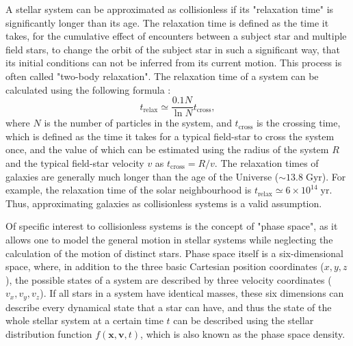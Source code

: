\documentclass[english, twoside]{HYgradu}
\begin{document}
A stellar system can be approximated as collisionless if its "relaxation time" is significantly longer than its age. The relaxation time is defined as the time it takes, for the cumulative effect of encounters between a subject star and multiple field stars, to change the orbit of the subject star in such a significant way, that its initial conditions can not be inferred from its current motion. This process is often called "two-body relaxation". The relaxation time of a system can be calculated using the following formula \citep{BinneyTremaine}:
\begin{equation}
t_\mathrm{relax} \simeq \frac{0.1N}{\ln N} t_\mathrm{cross},
\end{equation}
where $N$ is the number of particles in the system, and $t_\mathrm{cross}$ is the crossing time, which is defined as the time it takes for a typical field-star to cross the system once, and the value of which can be estimated using the radius of the system $R$ and the typical field-star velocity $v$ as $t_\mathrm{cross} = R/v$. The relaxation times of galaxies are generally much longer than the age of the Universe ($\sim 13.8 \; \mathrm{Gyr}$). For example, the relaxation time of the solar neighbourhood is $t_\mathrm{relax} \simeq 6 \times 10^{14} \; \mathrm{yr}$. Thus, approximating galaxies as collisionless systems is a valid assumption.

Of specific interest to collisionless systems is the concept of "phase space", as it allows one to model the general motion in stellar systems while neglecting the calculation of the motion of distinct stars. Phase space itself is a six-dimensional space, where, in addition to the three basic Cartesian position coordinates ($x, y, z$), the possible states of a system are described by three velocity coordinates ($v_x, v_y, v_z$). If all stars in a system have identical masses, these six dimensions can describe every dynamical state that a star can have, and thus the state of the whole stellar system at a certain time $t$ can be described using the stellar distribution function $f(\mathbf{x}, \mathbf{v}, t)$, which is also known as the phase space density. 
\end{document}
